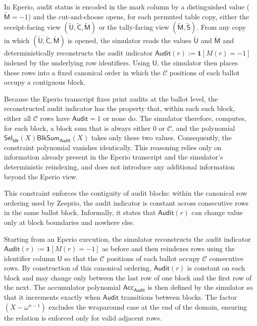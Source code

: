 In Eperio, audit status is encoded in the mark column by a distinguished value ($\widetilde{\mathsf{M}}=-1$) and the cut-and-choose opens, for each permuted
table copy, either the receipt-facing view $(\widetilde{\mathsf{U}},\widetilde{\mathsf{C}},\widetilde{\mathsf{M}})$ or the tally-facing view $(\widetilde{\mathsf{M}},\widetilde{\mathsf{S}})$. From any copy in which $(\widetilde{\mathsf{U}},\widetilde{\mathsf{C}},\widetilde{\mathsf{M}})$ is opened, the simulator reads the values
$\widetilde{\mathsf{U}}$ and $\widetilde{\mathsf{M}}$ and deterministically reconstructs the audit indicator $\mathsf{Audit}(r):=\mathbf{1}[M(r)=-1]$ indexed by the underlying row identifiers. Using $\mathsf{U}$, the simulator then places these rows into a fixed canonical order in which the $\mathcal{C}$ positions of each ballot occupy a contiguous block.

Because the Eperio transcript fixes print audits at the ballot level, the reconstructed audit indicator has the property that, within each such block, either all $\mathcal{C}$ rows have $\mathsf{Audit}=1$ or none do. The simulator therefore, computes, for each block, a block sum that is always either $0$ or $\mathcal{C}$, and the polynomial
$\mathsf{Sel}_{\mathsf{blk}}(X)\mathsf{BlkSum}_{\mathsf{Audit}}(X)$ takes only these two values. Consequently, the constraint polynomial vanishes identically. This reasoning relies only on information already present in the Eperio transcript and the simulator’s deterministic reindexing, and does not introduce any additional information beyond the Eperio view.


This constraint enforces the contiguity of audit blocks: within the canonical row ordering used by Zeeprio, the audit indicator is constant across consecutive rows in the same ballot block. Informally, it states that $\mathsf{Audit}(r)$ can change value only at block boundaries and nowhere else.

Starting from an Eperio execution, the simulator reconstructs the audit indicator $\mathsf{Audit}(r):=\mathbf{1}[M(r)=-1]$ as before and then reindexes rows using the identifier column $\mathsf{U}$ so that the $\mathcal{C}$ positions of each ballot occupy $\mathcal{C}$ consecutive rows. By construction of this canonical
ordering, $\mathsf{Audit}(r)$ is constant on each block and may change only between the last row of one block and the first row of the next. The accumulator polynomial $\mathsf{Acc}_{\mathsf{Audit}}$ is then defined by the simulator so that it increments exactly when $\mathsf{Audit}$ transitions between blocks. The factor $(X-\omega^{n-1})$ excludes the wraparound case at the end of the domain, ensuring the relation is enforced only for valid adjacent rows.

